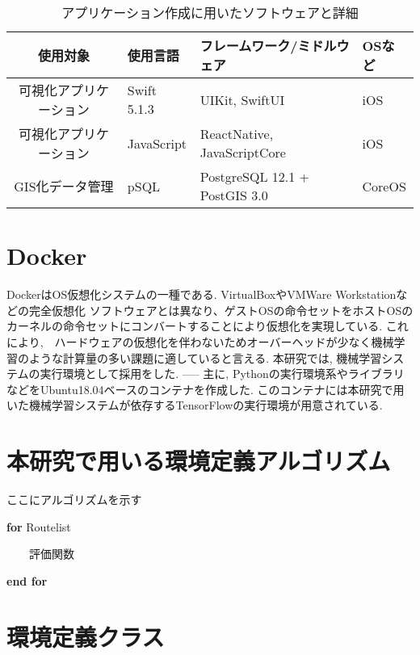 \begin{table}[h]
  \caption{アプリケーション作成に用いたソフトウェアと詳細}
  \label{table:SpeedOfLight}
  \centering
  \begin{tabular}{clll}
    \hline
      使用対象 & 使用言語 & フレームワーク/ミドルウェア & OSなど \\
      \hline \hline
      可視化アプリケーション & Swift 5.1.3 & UIKit, SwiftUI & iOS \\
      可視化アプリケーション & JavaScript & ReactNative, JavaScriptCore & iOS \\
      GIS化データ管理 & pSQL & PostgreSQL 12.1 + PostGIS 3.0 & CoreOS \\
    \hline
  \end{tabular}
\end{table}


\section{Docker}

DockerはOS仮想化システムの一種である. VirtualBoxやVMWare Workstationなどの完全仮想化
ソフトウェアとは異なり、ゲストOSの命令セットをホストOSのカーネルの命令セットにコンバートすることにより仮想化を実現している.
これにより,　ハードウェアの仮想化を伴わないためオーバーヘッドが少なく機械学習のような計算量の多い課題に適していると言える.
本研究では, 機械学習システムの実行環境として採用をした.
-----
主に, Pythonの実行環境系やライブラリなどをUbuntu18.04ベースのコンテナを作成した.
このコンテナには本研究で用いた機械学習システムが依存するTensorFlowの実行環境が用意されている.

\section{本研究で用いる環境定義アルゴリズム}

ここにアルゴリズムを示す

\textbf{for} Routelist

\ \ \ \ 評価関数

\textbf{end for}


\section{環境定義クラス}

